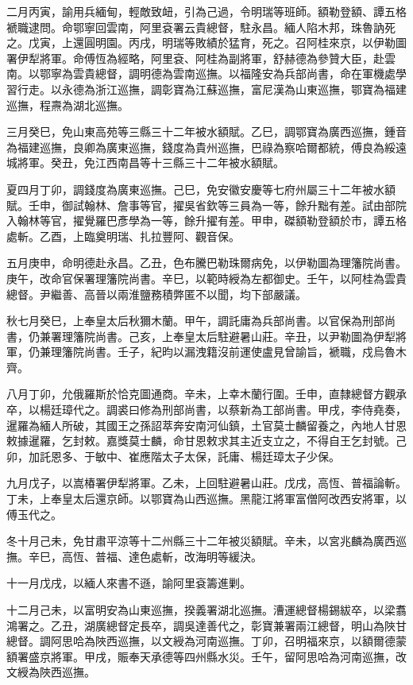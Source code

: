 \begin{pinyinscope}
二月丙寅，諭用兵緬甸，輕敵致衄，引為己過，令明瑞等班師。額勒登額、譚五格褫職逮問。命鄂寧回雲南，阿里袞署云貴總督，駐永昌。緬人陷木邦，珠魯訥死之。戊寅，上還圓明園。丙戌，明瑞等敗績於猛育，死之。召阿桂來京，以伊勒圖署伊犁將軍。命傅恆為經略，阿里袞、阿桂為副將軍，舒赫德為參贊大臣，赴雲南。以鄂寧為雲貴總督，調明德為雲南巡撫。以福隆安為兵部尚書，命在軍機處學習行走。以永德為浙江巡撫，調彰寶為江蘇巡撫，富尼漢為山東巡撫，鄂寶為福建巡撫，程燾為湖北巡撫。

三月癸巳，免山東高苑等三縣三十二年被水額賦。乙巳，調鄂寶為廣西巡撫，鍾音為福建巡撫，良卿為廣東巡撫，錢度為貴州巡撫，巴祿為察哈爾都統，傅良為綏遠城將軍。癸丑，免江西南昌等十三縣三十二年被水額賦。

夏四月丁卯，調錢度為廣東巡撫。己巳，免安徽安慶等七府州屬三十二年被水額賦。壬申，御試翰林、詹事等官，擢吳省欽等三員為一等，餘升黜有差。試由部院入翰林等官，擢覺羅巴彥學為一等，餘升擢有差。甲申，磔額勒登額於市，譚五格處斬。乙酉，上臨奠明瑞、扎拉豐阿、觀音保。

五月庚申，命明德赴永昌。乙丑，色布騰巴勒珠爾病免，以伊勒圖為理籓院尚書。庚午，改命官保署理籓院尚書。辛巳，以範時綬為左都御史。壬午，以阿桂為雲貴總督。尹繼善、高晉以兩淮鹽務積弊匿不以聞，均下部嚴議。

秋七月癸巳，上奉皇太后秋獮木蘭。甲午，調託庸為兵部尚書。以官保為刑部尚書，仍兼署理籓院尚書。己亥，上奉皇太后駐避暑山莊。辛丑，以尹勒圖為伊犁將軍，仍兼理籓院尚書。壬子，紀昀以漏洩籍沒前運使盧見曾諭旨，褫職，戍烏魯木齊。

八月丁卯，允俄羅斯於恰克圖通商。辛未，上幸木蘭行圍。壬申，直隸總督方觀承卒，以楊廷璋代之。調裘曰修為刑部尚書，以蔡新為工部尚書。甲戌，李侍堯奏，暹羅為緬人所破，其國王之孫詔萃奔安南河仙鎮，土官莫士麟留養之，內地人甘恩敕據暹羅，乞封敕。嘉獎莫士麟，命甘恩敕求其主近支立之，不得自王乞封號。己卯，加託恩多、于敏中、崔應階太子太保，託庸、楊廷璋太子少保。

九月戊子，以嵩椿署伊犁將軍。乙未，上回駐避暑山莊。戊戌，高恆、普福論斬。丁未，上奉皇太后還京師。以鄂寶為山西巡撫。黑龍江將軍富僧阿改西安將軍，以傅玉代之。

冬十月己未，免甘肅平涼等十二州縣三十二年被災額賦。辛未，以宮兆麟為廣西巡撫。辛巳，高恆、普福、達色處斬，改海明等緩決。

十一月戊戌，以緬人來書不遜，諭阿里袞籌進剿。

十二月己未，以富明安為山東巡撫，揆義署湖北巡撫。漕運總督楊錫紱卒，以梁翥鴻署之。乙丑，湖廣總督定長卒，調吳達善代之，彰寶兼署兩江總督，明山為陜甘總督。調阿思哈為陜西巡撫，以文綬為河南巡撫。丁卯，召明福來京，以額爾德蒙額署盛京將軍。甲戌，賑奉天承德等四州縣水災。壬午，留阿思哈為河南巡撫，改文綬為陜西巡撫。


\end{pinyinscope}
